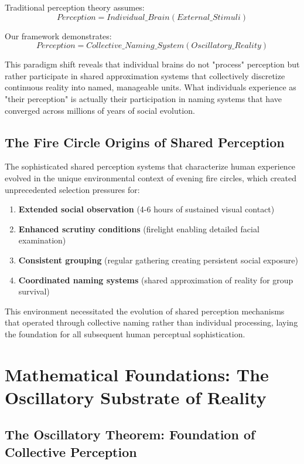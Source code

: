\documentclass[12pt]{article}
\begin{document}
Traditional perception theory assumes:
$$Perception = Individual\_Brain(External\_Stimuli)$$

Our framework demonstrates:
$$Perception = Collective\_Naming\_System(Oscillatory\_Reality)$$

This paradigm shift reveals that individual brains do not "process" perception but rather participate in shared approximation systems that collectively discretize continuous reality into named, manageable units. What individuals experience as "their perception" is actually their participation in naming systems that have converged across millions of years of social evolution.

\subsection{The Fire Circle Origins of Shared Perception}

The sophisticated shared perception systems that characterize human experience evolved in the unique environmental context of evening fire circles, which created unprecedented selection pressures for:

\begin{enumerate}
\item \textbf{Extended social observation} (4-6 hours of sustained visual contact)
\item \textbf{Enhanced scrutiny conditions} (firelight enabling detailed facial examination)
\item \textbf{Consistent grouping} (regular gathering creating persistent social exposure)
\item \textbf{Coordinated naming systems} (shared approximation of reality for group survival)
\end{enumerate}

This environment necessitated the evolution of shared perception mechanisms that operated through collective naming rather than individual processing, laying the foundation for all subsequent human perceptual sophistication.

\section{Mathematical Foundations: The Oscillatory Substrate of Reality}

\subsection{The Oscillatory Theorem: Foundation of Collective Perception}
\end{document}
